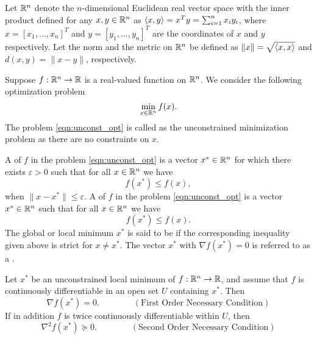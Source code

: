 \documentclass[11pt,a4paper]{article}
\begin{document}
Let $\mathbb{R}^n$ denote the $n$-dimensional Euclidean real vector space with the inner product defined for any $x,y\in \mathbb{R}^n$ as $\langle x, y \rangle = x^Ty = \sum_{i=1}^n x_i y_i$, where $x = [x_1,\ldots, x_n]^T$ and $y = [y_1,\ldots, y_n]^T$ are the coordinates of $x$ and $y$ respectively. Let the norm and the metric on $\mathbb{R}^n$ be defined as $\|x\| = \sqrt{\langle x, x \rangle}$ and $d(x,y) = \|x-y\|$, respectively.

Suppose $f:\mathbb{R}^n\rightarrow \mathbb{R}$ is a real-valued function on $\mathbb{R}^n$. We consider the following optimization problem 
\begin{equation}\label{eqn:unconst_opt}
    \min_{x\in\mathbb{R}^n} f(x).
\end{equation}
The problem \eqref{eqn:unconst_opt} is called as the unconstrained minimization problem as there are no constraints on $x$. 

\begin{definition}\label{def:optimal_points}
    A  of $f$ in the problem \eqref{eqn:unconst_opt} is a vector $x^*\in\mathbb{R}^n$ for which there exists $\varepsilon>0$ such that for all $x\in\mathbb{R}^n$ we have
    \begin{equation}\label{eqn:local_min}
        f(x^*)\le f(x),
    \end{equation}
    when $\|x-x^*\|\le \varepsilon$.
    A  of $f$ in the problem \eqref{eqn:unconst_opt} is a vector $x^*\in\mathbb{R}^n$ such that for all $x\in\mathbb{R}^n$ we have
    \begin{equation}\label{eqn:global_min}
        f(x^*)\le f(x).
    \end{equation}
    The global or local minimum $x^*$ is said to be  if the corresponding inequality given above is strict for $x\neq x^*$. The vector $x^*$ with $\nabla f(x^*) = 0$ is referred to as a . 
\end{definition}

\begin{proposition}
    Let $x^*$ be an unconstrained local minimum of $f:\mathbb{R}^n\rightarrow \mathbb{R}$, and assume that $f$ is continuously differentiable in an open set $U$ containing $x^*$. Then 
    \begin{equation*}
        \nabla f(x^*) = 0.\qquad\qquad (\text{First Order Necessary Condition})
    \end{equation*}
    If in addition $f$ is twice continuously differentiable within $U$, then
    \begin{equation*}
        \nabla^2 f(x^*) \succeq 0.\qquad\qquad (\text{Second Order Necessary Condition})
    \end{equation*}
\end{proposition}
    
\end{document}
